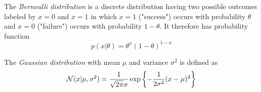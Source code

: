 \documentclass[a4paper]{article}
\begin{document}
\begin{exam}
%
%
%
%
%
The \emph{Bernoulli distribution} is a discrete distribution having two possible outcomes labeled by $x = 0$ and $x = 1$ in which $x = 1$ ("success") occurs with probability $\theta$ and $x = 0$ ("failure") occurs with probability $1-\theta$. It therefore has probability function
\begin{equation}
p(x|\theta) =\theta^x(1-\theta)^{1-x}
\tag{A.1}
\end{equation}

The \emph{Gaussian distribution} with mean $\mu$ and variance $\sigma^2$ is defined as
$$
\mathcal{N}(x|\mu,\sigma^2) = \frac{1}{\sqrt{2\pi}\sigma} \exp\left\{-\frac{1}{2\sigma^2}(x-\mu)^2\right\}
$$
\end{exam}
\end{document}
